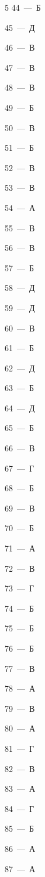 \documentclass[12pt]{article}
\begin{document}
\begin{multicols}{5}
\mbox{44~--- Б}\par
\mbox{45~--- Д}\par
\mbox{46~--- В}\par
\mbox{47~--- В}\par
\mbox{48~--- В}\par
\mbox{49~--- Б}\par
\mbox{50~--- В}\par
\mbox{51~--- Б}\par
\mbox{52~--- В}\par
\mbox{53~--- В}\par
\mbox{54~--- А}\par
\mbox{55~--- В}\par
\mbox{56~--- В}\par
\mbox{57~--- Б}\par
\mbox{58~--- Д}\par
\mbox{59~--- Д}\par
\mbox{60~--- В}\par
\mbox{61~--- Б}\par
\mbox{62~--- Д}\par
\mbox{63~--- Б}\par
\mbox{64~--- Д}\par
\mbox{65~--- Б}\par
\mbox{66~--- В}\par
\mbox{67~--- Г}\par
\mbox{68~--- Б}\par
\mbox{69~--- В}\par
\mbox{70~--- Б}\par
\mbox{71~--- А}\par
\mbox{72~--- В}\par
\mbox{73~--- Г}\par
\mbox{74~--- Б}\par
\mbox{75~--- Б}\par
\mbox{76~--- Б}\par
\mbox{77~--- В}\par
\mbox{78~--- А}\par
\mbox{79~--- В}\par
\mbox{80~--- А}\par
\mbox{81~--- Г}\par
\mbox{82~--- В}\par
\mbox{83~--- А}\par
\mbox{84~--- Г}\par
\mbox{85~--- Б}\par
\mbox{86~--- А}\par
\mbox{87~--- А}\par

\end{multicols}
\end{document}
